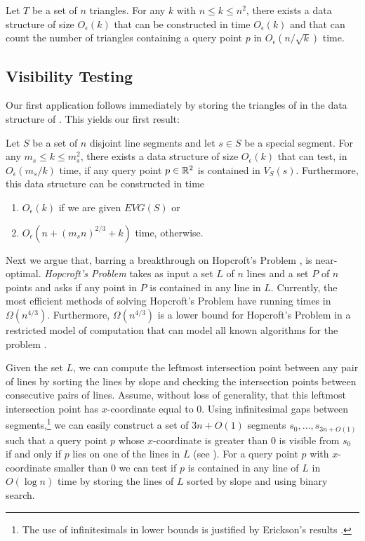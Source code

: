 \documentclass{patmorin}
\newcommand{\EVG}{\mathit{EVG}}
\newcommand{\Oe}{O_\epsilon}
\begin{document}
\begin{thm}[\cite{ae99,m92}]
Let $T$ be a set of $n$ triangles. For any $k$ with $n\le k\le n^2$, there
exists a data structure of size $\Oe(k)$ that can be constructed in time
$\Oe(k)$ and that can count the number of triangles containing a query
point $p$ in $\Oe(n/\sqrt{k})$ time.
\end{thm}


\subsection{Visibility Testing}

Our first application follows immediately by storing the triangles of
 in the data structure of .  This
yields our first result:

\begin{thm}
Let $S$ be a set of $n$ disjoint line segments and let $s\in S$
be a special segment.  For any $m_s\le k\le m_s^2$, there exists a
data structure of size $\Oe(k)$ that can test, in $\Oe(m_s/k)$ time,
if any query point $p\in\mathbb{R}^2$ is contained in $V_S(s)$.  Furthermore,
this data structure can be constructed in time
\begin{enumerate}
  \item $\Oe(k)$ if we are given $\EVG(S)$ or
  \item $\Oe(n + (m_sn)^{2/3} + k)$ time, otherwise.
\end{enumerate}
\end{thm}


Next we argue that, barring a breakthrough on Hopcroft's Problem
\cite{e96},  is near-optimal.  \emph{Hopcroft's
Problem} takes as input a set $L$ of $n$ lines and a set $P$ of $n$ points
and asks if any point in $P$ is contained in any line in $L$. Currently,
the most efficient methods of solving Hopcroft's Problem have running
times in $\Omega(n^{4/3})$.  Furthermore, $\Omega(n^{4/3})$ is a lower
bound for Hopcroft's Problem in a restricted model of computation that
can model all known algorithms for the problem \cite{e96}.

Given the set $L$, we can compute the leftmost intersection point between
any pair of lines by sorting the lines by slope and checking the
intersection points between consecutive pairs of lines.  Assume, without
loss of generality, that this leftmost intersection point has
$x$-coordinate equal to 0. Using infinitesimal gaps between
segments,\footnote{The use of infinitesimals in lower bounds is justified
by Erickson's results \cite{e99b}.} we can easily construct a set of $3n+O(1)$
segments $s_0,\ldots,s_{3n+O(1)}$ such that a query point $p$ whose
$x$-coordinate is greater than 0 is visible from $s_0$ if and only if $p$
lies on one of the lines in $L$ (see ).  For a query point
$p$ with $x$-coordinate smaller than 0 we can test if $p$ is contained in
any line of $L$ in $O(\log n)$ time by storing the lines of $L$ sorted by
slope and using binary search.
\end{document}
